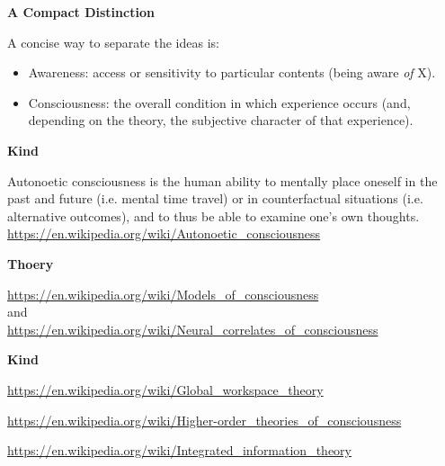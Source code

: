 \documentclass{book}
\providecommand{\ProjectDeepHeading}[2]{%
    \par\medskip\noindent\textbf{#2}\par\smallskip
}
\begin{document}
    
    \ProjectDeepHeading{5}{A Compact Distinction}
        
        A concise way to separate the ideas is:
        \begin{itemize}
            \item Awareness: access or sensitivity to particular contents (being aware \emph{of} X).
            \item Consciousness: the overall condition in which experience occurs (and, depending on the theory, the subjective character of that experience).
        \end{itemize}

\ProjectDeepHeading{2}{Kind}


Autonoetic consciousness is the human ability to mentally place oneself in the past and future (i.e. mental time travel) or in counterfactual situations (i.e. alternative outcomes), and to thus be able to examine one's own thoughts.
    \url{https://en.wikipedia.org/wiki/Autonoetic_consciousness}

\ProjectDeepHeading{2}{Thoery}


\url{https://en.wikipedia.org/wiki/Models_of_consciousness} 
    \\ 
    and
    \\
    \url{https://en.wikipedia.org/wiki/Neural_correlates_of_consciousness}

\ProjectDeepHeading{3}{Kind}


\url{https://en.wikipedia.org/wiki/Global_workspace_theory}


\url{https://en.wikipedia.org/wiki/Higher-order_theories_of_consciousness}


\url{https://en.wikipedia.org/wiki/Integrated_information_theory}
\end{document}

